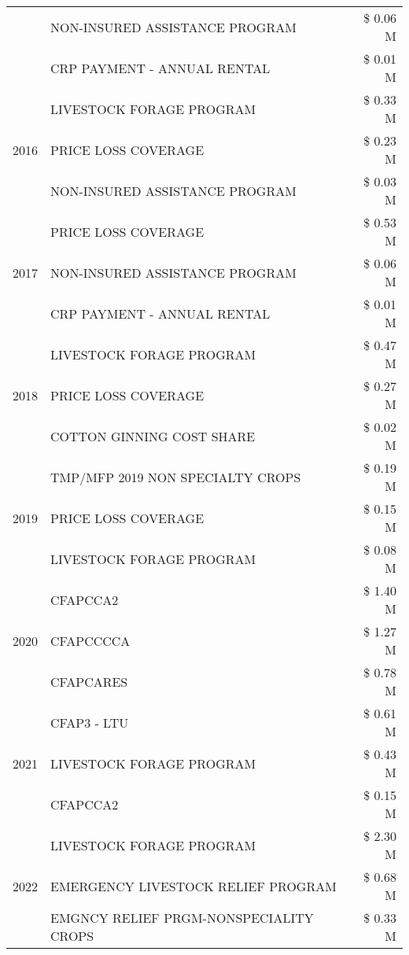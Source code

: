 \begin{tabular}{llr}
 & NON-INSURED ASSISTANCE PROGRAM & \$ 0.06 M \\
 & CRP PAYMENT - ANNUAL RENTAL & \$ 0.01 M \\
\cline{1-3}
\multirow[t]{3}{*}{2016} & LIVESTOCK FORAGE PROGRAM & \$ 0.33 M \\
 & PRICE LOSS COVERAGE & \$ 0.23 M \\
 & NON-INSURED ASSISTANCE PROGRAM & \$ 0.03 M \\
\cline{1-3}
\multirow[t]{3}{*}{2017} & PRICE LOSS COVERAGE & \$ 0.53 M \\
 & NON-INSURED ASSISTANCE PROGRAM & \$ 0.06 M \\
 & CRP PAYMENT - ANNUAL RENTAL & \$ 0.01 M \\
\cline{1-3}
\multirow[t]{3}{*}{2018} & LIVESTOCK FORAGE PROGRAM & \$ 0.47 M \\
 & PRICE LOSS COVERAGE & \$ 0.27 M \\
 & COTTON GINNING COST SHARE & \$ 0.02 M \\
\cline{1-3}
\multirow[t]{3}{*}{2019} & TMP/MFP 2019 NON SPECIALTY CROPS & \$ 0.19 M \\
 & PRICE LOSS COVERAGE & \$ 0.15 M \\
 & LIVESTOCK FORAGE PROGRAM & \$ 0.08 M \\
\cline{1-3}
\multirow[t]{3}{*}{2020} & CFAPCCA2 & \$ 1.40 M \\
 & CFAPCCCCA & \$ 1.27 M \\
 & CFAPCARES & \$ 0.78 M \\
\cline{1-3}
\multirow[t]{3}{*}{2021} & CFAP3 - LTU & \$ 0.61 M \\
 & LIVESTOCK FORAGE PROGRAM & \$ 0.43 M \\
 & CFAPCCA2 & \$ 0.15 M \\
\cline{1-3}
\multirow[t]{3}{*}{2022} & LIVESTOCK FORAGE PROGRAM & \$ 2.30 M \\
 & EMERGENCY LIVESTOCK RELIEF PROGRAM & \$ 0.68 M \\
 & EMGNCY RELIEF PRGM-NONSPECIALITY CROPS & \$ 0.33 M \\
\cline{1-3}
\bottomrule
\end{tabular}
